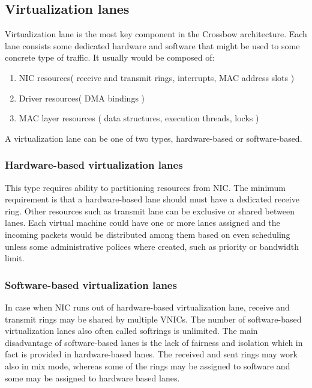 \documentclass[11pt]{book}
\begin{document}
		\subsection{Virtualization lanes}

      Virtualization lane is the most key component in the Crossbow architecture. Each lane consists
      some dedicated hardware and software that might be used to some concrete type of traffic. It
      usually would be composed of: 

			\begin{enumerate}
				\item{NIC resources( receive and transmit rings, interrupts, MAC address slots )}
				\item{Driver resources( DMA bindings )}
				\item{MAC layer resources ( data structures, execution threads, locks )}
			\end{enumerate}
			
			A virtualization lane can be one of two types, hardware-based or software-based.
			
			\subsubsection{Hardware-based virtualization lanes}
			
      This type requires ability to partitioning resources from NIC. The minimum requirement is that a hardware-based
      lane should must have a dedicated receive ring.  Other resources such as transmit lane can be exclusive or shared
      between lanes. Each virtual machine could have one or more lanes assigned and the incoming packets would be
      distributed among them based on even scheduling unless some administrative polices where created, such as priority
      or bandwidth limit.		
			
			\subsubsection{Software-based virtualization lanes}
			
      In case when NIC runs out of hardware-based virtualization lane, receive and transmit rings may be shared by
      multiple VNICs. The number of software-based virtualization lanes also often called softrings is unlimited. The
      main disadvantage of software-based lanes is the lack of fairness and isolation which in fact is provided in
      hardware-based lanes. The received and sent rings may work also in mix mode, whereas some of the rings may be
      assigned to software and some may be assigned to hardware based lanes.	
			
\end{document}
